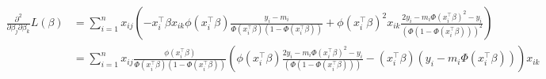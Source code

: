 \documentclass[12pt,a4paper]{amsart}
\theoremstyle{definition} %
\theoremstyle{plain} %
\begin{document}
\begin{align*} %
    \frac{\partial^2}{\partial\beta_{j}\partial\beta_{k}}L(\beta) &= \sum_{i = 1}^{n}x_{ij}\left(-x_{i}^\top\beta x_{ik} \phi(x_{i}^\top\beta)\frac{y_{i}-m_{i}}{\Phi(x_{i}^\top\beta)(1-\Phi(x_{i}^\top\beta))}
            +\phi(x_{i}^\top\beta)^2x_{ik}\frac{2y_{i} - m_{i}\Phi(x_{i}^\top\beta)^2 - y_{i}}{(\Phi(1-\Phi(x_{i}^\top\beta)))^2}\right) \\
    &= \sum_{i=1}^{n}x_{ij}\frac{\phi(x_{i}^\top\beta)}{\Phi(x_{i}^\top\beta)(1-\Phi(x_{i}^\top\beta))}\left(\phi(x_{i}^\top\beta)\frac{2y_{i} - m_{i}\Phi(x_{i}^\top\beta)^2 - y_{i}}{(\Phi(1-\Phi(x_{i}^\top\beta)))}
    -(x_{i}^\top\beta)(y_{i}-m_{i}\Phi(x_{i}^\top\beta)) \right)x_{ik}
\end{align*}
\end{document}
